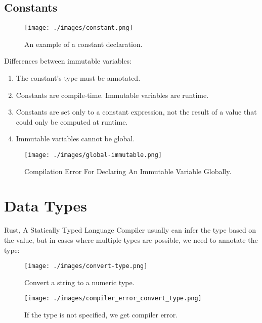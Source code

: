 \documentclass[10pt]{beamer}
\begin{document}
\subsection{Constants}
\begin{frame}
    \begin{figure}[htpb]
        \centering
        \texttt{[image: ./images/constant.png]}
        \caption{An example of a constant declaration.\cite{rust-book}}
    \end{figure}

    Differences between immutable variables\cite{rust-book}:
    \begin{enumerate}
        \item The constant's type must be annotated.
        \item Constants are compile-time. Immutable variables are runtime.
        \item Constants are set only to a constant expression, not the result of a value that could only be computed at runtime.
        \item Immutable variables cannot be global.
    \end{enumerate}

    \begin{figure}[htpb]
        \centering
        \texttt{[image: ./images/global-immutable.png]}
        \caption{Compilation Error For Declaring An Immutable Variable Globally.}
    \end{figure}
\end{frame}


\section{Data Types}
\begin{frame}{Rust, A Statically Typed Language}
    Compiler usually can infer the type based on the value, but in cases where multiple types are possible, we need to annotate the type:

    \begin{figure}[htpb]
        \centering
        \texttt{[image: ./images/convert-type.png]}
        \vspace*{-2mm}
        \caption{Convert a string to a numeric type.\cite{rust-book}}
    \end{figure}

    \vspace*{-5mm}
    \begin{figure}[htpb]
        \centering
        \texttt{[image: ./images/compiler\_error\_convert\_type.png]}
        \caption{If the type is not specified, we get compiler error.\cite{rust-book}}
    \end{figure}
\end{frame}
\end{document}
